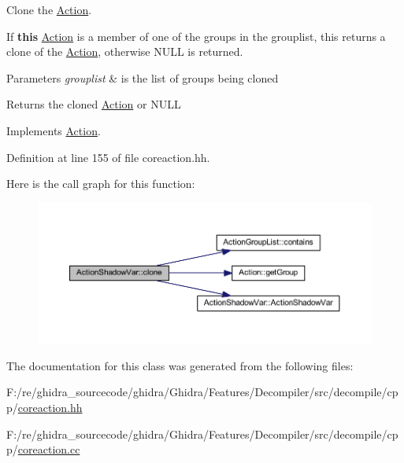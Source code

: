 Clone the \mbox{\hyperlink{class_action}{Action}}. 

If {\bfseries{this}} \mbox{\hyperlink{class_action}{Action}} is a member of one of the groups in the grouplist, this returns a clone of the \mbox{\hyperlink{class_action}{Action}}, otherwise N\+U\+LL is returned. 
\begin{DoxyParams}{Parameters}
{\em grouplist} & is the list of groups being cloned \\
\hline
\end{DoxyParams}
\begin{DoxyReturn}{Returns}
the cloned \mbox{\hyperlink{class_action}{Action}} or N\+U\+LL 
\end{DoxyReturn}


Implements \mbox{\hyperlink{class_action_af8242e41d09e5df52f97df9e65cc626f}{Action}}.



Definition at line 155 of file coreaction.\+hh.

Here is the call graph for this function\+:
\nopagebreak
\begin{figure}[H]
\begin{center}
\leavevmode
\includegraphics[width=350pt]{class_action_shadow_var_ad60ce611f28bd7c51a34b8905cfe0155_cgraph}
\end{center}
\end{figure}


The documentation for this class was generated from the following files\+:\begin{DoxyCompactItemize}
\item 
F\+:/re/ghidra\+\_\+sourcecode/ghidra/\+Ghidra/\+Features/\+Decompiler/src/decompile/cpp/\mbox{\hyperlink{coreaction_8hh}{coreaction.\+hh}}\item 
F\+:/re/ghidra\+\_\+sourcecode/ghidra/\+Ghidra/\+Features/\+Decompiler/src/decompile/cpp/\mbox{\hyperlink{coreaction_8cc}{coreaction.\+cc}}\end{DoxyCompactItemize}
